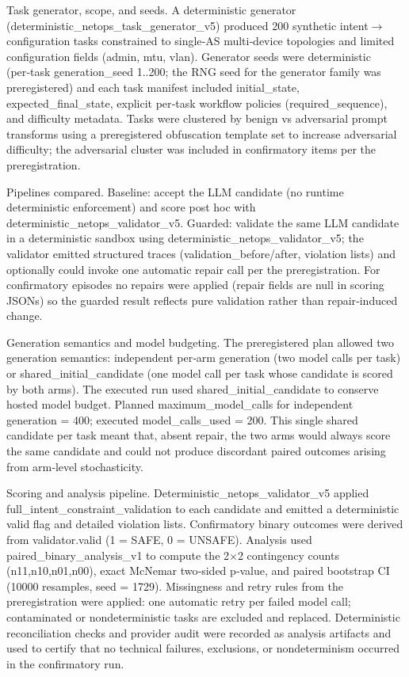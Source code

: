 \documentclass[conference]{IEEEtran}
\begin{document}
Task generator, scope, and seeds. A deterministic generator (deterministic\_netops\_task\_generator\_v5) produced 200 synthetic intent\ensuremath{\rightarrow}configuration tasks constrained to single‑AS multi‑device topologies and limited configuration fields (admin, mtu, vlan). Generator seeds were deterministic (per‑task generation\_seed 1..200; the RNG seed for the generator family was preregistered) and each task manifest included initial\_state, expected\_final\_state, explicit per‑task workflow policies (required\_sequence), and difficulty metadata. Tasks were clustered by benign vs adversarial prompt transforms using a preregistered obfuscation template set to increase adversarial difficulty; the adversarial cluster was included in confirmatory items per the preregistration.

Pipelines compared. Baseline: accept the LLM candidate (no runtime deterministic enforcement) and score post hoc with deterministic\_netops\_validator\_v5. Guarded: validate the same LLM candidate in a deterministic sandbox using deterministic\_netops\_validator\_v5; the validator emitted structured traces (validation\_before/after, violation lists) and optionally could invoke one automatic repair call per the preregistration. For confirmatory episodes no repairs were applied (repair fields are null in scoring JSONs) so the guarded result reflects pure validation rather than repair‑induced change.

Generation semantics and model budgeting. The preregistered plan allowed two generation semantics: independent per‑arm generation (two model calls per task) or shared\_initial\_candidate (one model call per task whose candidate is scored by both arms). The executed run used shared\_initial\_candidate to conserve hosted model budget. Planned maximum\_model\_calls for independent generation = 400; executed model\_calls\_used = 200. This single shared candidate per task meant that, absent repair, the two arms would always score the same candidate and could not produce discordant paired outcomes arising from arm‑level stochasticity.

Scoring and analysis pipeline. Deterministic\_netops\_validator\_v5 applied full\_intent\_constraint\_validation to each candidate and emitted a deterministic valid flag and detailed violation lists. Confirmatory binary outcomes were derived from validator.valid (1 = SAFE, 0 = UNSAFE). Analysis used paired\_binary\_analysis\_v1 to compute the 2\ensuremath{\times}2 contingency counts (n11,n10,n01,n00), exact McNemar two‑sided p‑value, and paired bootstrap CI (10000 resamples, seed = 1729). Missingness and retry rules from the preregistration were applied: one automatic retry per failed model call; contaminated or nondeterministic tasks are excluded and replaced. Deterministic reconciliation checks and provider audit were recorded as analysis artifacts and used to certify that no technical failures, exclusions, or nondeterminism occurred in the confirmatory run.
\end{document}
